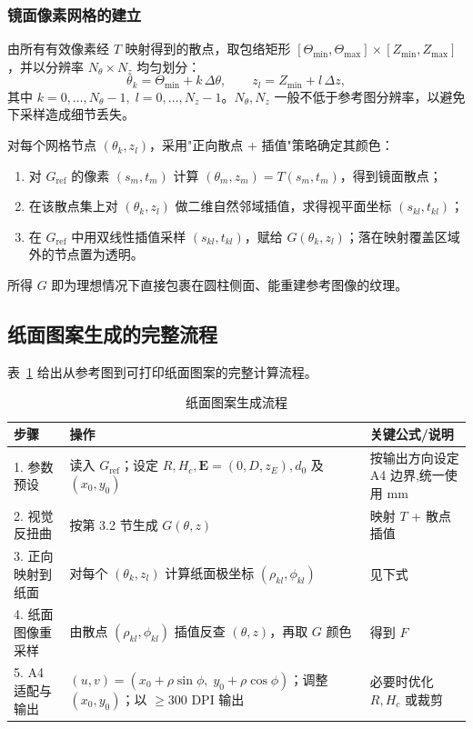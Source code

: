 \documentclass[12pt, a4paper]{ctexart}
\begin{document}
\subsubsection{镜面像素网格的建立}

由所有有效像素经 $T$ 映射得到的散点，取包络矩形 $[\Theta_{\min},\Theta_{\max}]\times[Z_{\min},Z_{\max}]$，并以分辨率 $N_\theta\times N_z$ 均匀划分：
\[
\theta_k=\Theta_{\min}+k\,\Delta\theta,\qquad z_l=Z_{\min}+l\,\Delta z,
\]
其中 $k=0,\ldots,N_\theta-1,\;l=0,\ldots,N_z-1$。$N_\theta,N_z$ 一般不低于参考图分辨率，以避免下采样造成细节丢失。

对每个网格节点 $(\theta_k,z_l)$，采用"正向散点 + 插值"策略确定其颜色：
\begin{enumerate}
    \item 对 $G_{\mathrm{ref}}$ 的像素 $(s_m,t_m)$ 计算 $(\theta_m,z_m)=T(s_m,t_m)$，得到镜面散点；
    \item 在该散点集上对 $(\theta_k,z_l)$ 做二维自然邻域插值，求得视平面坐标 $(s_{kl},t_{kl})$；
    \item 在 $G_{\mathrm{ref}}$ 中用双线性插值采样 $(s_{kl},t_{kl})$，赋给 $G(\theta_k,z_l)$；落在映射覆盖区域外的节点置为透明。
\end{enumerate}
所得 $G$ 即为理想情况下直接包裹在圆柱侧面、能重建参考图像的纹理。

\subsection{纸面图案生成的完整流程}

表~\ref{tab:pipeline} 给出从参考图到可打印纸面图案的完整计算流程。

\begin{table}[htbp]
\centering
\caption{纸面图案生成流程}
\label{tab:pipeline}
\begin{tabularx}{\textwidth}{lXX}
\toprule
\textbf{步骤} & \textbf{操作} & \textbf{关键公式/说明} \\
\midrule
1. 参数预设 & 读入 $G_{\mathrm{ref}}$；设定 $R,H_c,\mathbf{E}=(0,D,z_E),d_0$ 及 $(x_0,y_0)$ & 按输出方向设定 A4 边界,统一使用 mm \\
2. 视觉反扭曲 & 按第 3.2 节生成 $G(\theta,z)$ & 映射 $T$ + 散点插值 \\
3. 正向映射到纸面 & 对每个 $(\theta_k,z_l)$ 计算纸面极坐标 $(\rho_{kl},\phi_{kl})$ & 见下式 \\
4. 纸面图像重采样 & 由散点 $(\rho_{kl},\phi_{kl})$ 插值反查 $(\theta,z)$，再取 $G$ 颜色 & 得到 $F$ \\
5. A4 适配与输出 & $(u,v)=(x_0+\rho\sin\phi,\;y_0+\rho\cos\phi)$；调整 $(x_0,y_0)$；以 $\geq300$ DPI 输出 & 必要时优化 $R,H_c$ 或裁剪 \\
\bottomrule
\end{tabularx}
\end{table}
\end{document}
